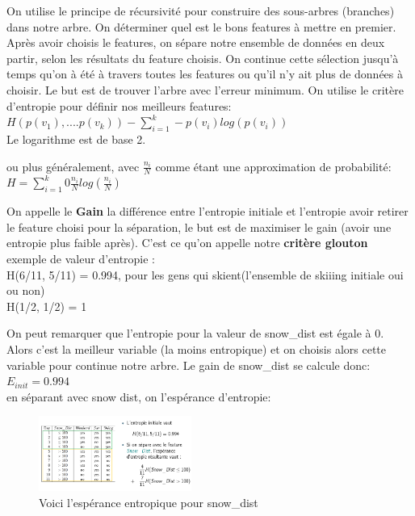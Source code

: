 \documentclass[oneside]{book}
\begin{document}
On utilise le principe de récursivité pour construire des sous-arbres (branches) dans notre arbre. On déterminer quel est le bons features à mettre en premier. Après avoir choisis le features, on sépare notre ensemble de données en deux partir, selon les résultats du feature choisis. On continue cette sélection jusqu'à temps qu'on à été à travers toutes les features ou qu'il n'y ait plus de données à choisir. Le but est de trouver l'arbre avec l'erreur minimum. On utilise le critère d'entropie pour définir nos meilleurs features:  \\

$H(p(v_1), ....p(v_k)) - \sum\limits_{i=1}^k -p(v_i)log(p(v_i))$\\

Le logarithme est de base 2.

ou plus généralement, avec $\frac{n_i}{N}$ comme étant une approximation de probabilité:\\

\centering
$H = \sum\limits_{i=1}^k 0 \frac{n_i}{N} log (\frac{n_i}{N})$
\justify


On appelle le \textbf{Gain} la différence entre l'entropie initiale et l'entropie avoir retirer le feature choisi pour la séparation, le but est de maximiser le gain (avoir une entropie plus faible après). C'est ce qu'on appelle notre \textbf{critère glouton}\\

exemple de valeur d'entropie : \\

H(6/11, 5/11) = 0.994, pour les gens qui skient(l'ensemble de skiiing initiale oui ou non)\\

H(1/2, 1/2) = 1

On peut remarquer que l'entropie pour la valeur de snow\_dist est égale à 0. Alors c'est la meilleur variable (la moins entropique) et on choisis alors cette variable pour continue notre arbre. Le gain de snow\_dist se calcule donc: \\

$E_{init} = 0.994$\\

en séparant avec snow dist, on l'espérance d'entropie:

\begin{figure}[!ht]
\centering
\includegraphics[width = 5cm]{entropie1.png}
\caption{Voici l'espérance entropique pour snow\_dist}
\end{figure}
\end{document}

